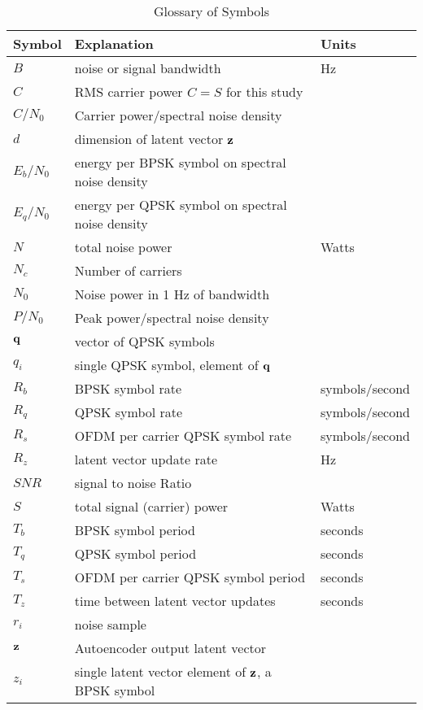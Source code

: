 \documentclass{article}
\begin{document}
\begin{table} [H]
\centering
\begin{tabular}{l l l}
 \hline
 Symbol & Explanation & Units \\
 \hline
 $B$ & noise or signal bandwidth & Hz \\
 $C$ & RMS carrier power $C=S$ for this study \\
 $C/N_0$ & Carrier power/spectral noise density \\
 $d$ & dimension of latent vector $\bf{z}$ \\
 $E_b/N_0$ & energy per BPSK symbol on spectral noise density \\
 $E_q/N_0$ & energy per QPSK symbol on spectral noise density \\
 $N$ & total noise power & Watts \\
 $N_c$ & Number of carriers  \\
 $N_0$ & Noise power in 1 Hz of bandwidth  \\
 $P/N_0$ & Peak power/spectral noise density \\
 $\bf{q}$ & vector of QPSK symbols \\ 
 $q_i$ & single QPSK symbol, element of $\bf{q}$ \\ 
 $R_b$ & BPSK symbol rate & symbols/second \\
 $R_q$ & QPSK symbol rate & symbols/second \\
 $R_s$ & OFDM per carrier QPSK symbol rate & symbols/second \\
 $R_z$ & latent vector update rate & Hz \\
 $SNR$ & signal to noise Ratio \\
 $S$ & total signal (carrier) power & Watts \\
 $T_b$ & BPSK symbol period & seconds \\
 $T_q$ & QPSK symbol period & seconds \\
 $T_s$ & OFDM per carrier QPSK symbol period & seconds\\
 $T_z$ & time between latent vector updates & seconds\\
 $r_i$ & noise sample \\
 $\bf{z}$ & Autoencoder output latent vector \\ 
 $z_i$ & single latent vector element of $\bf{z}$, a BPSK symbol \\ 
 \hline
\end{tabular}
\caption{Glossary of Symbols}
\end{table}

\nocite{*}


\end{document}
